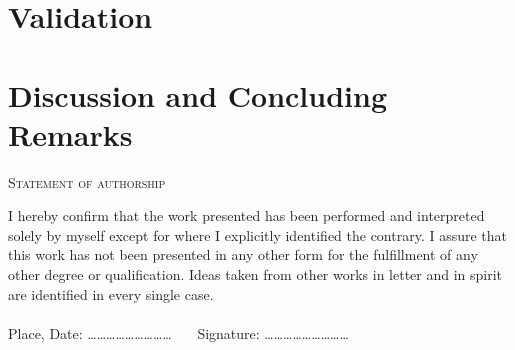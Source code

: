 \documentclass[a4paper,captions=tableheading,12pt]{scrartcl}
\begin{document}
	\section{Validation} \label{sec:validation}
	
	
	\section{Discussion and Concluding Remarks} \label{sec:conclusion}
	
	
	\pagebreak
	\printbibliography[title={References}]
	
	\pagebreak
	\appendix
	 \label{sec:appendix}
	
	\setcounter{equation}{0}
	\setcounter{figure}{0}
%	
	
	\clearpage 
	\begin{center}
		\textsc{Statement of authorship}
	\end{center}
	I  hereby confirm that the  work  presented  has  been  performed  and interpreted solely by myself except for where I explicitly identified the contrary. I assure  that  this  work  has not been presented in  any  other form  for  the  fulfillment  of  any  other  degree  or  qualification.  Ideas taken  from  other  works in  letter and  in  spirit are identified in every single case.
	\\ \\
	Place, Date: \dots\dots \dots \dots \dots \dots \dots \dots \dots ~~~ Signature: \dots \dots \dots \dots \dots \dots \dots \dots \dots
\end{document}
